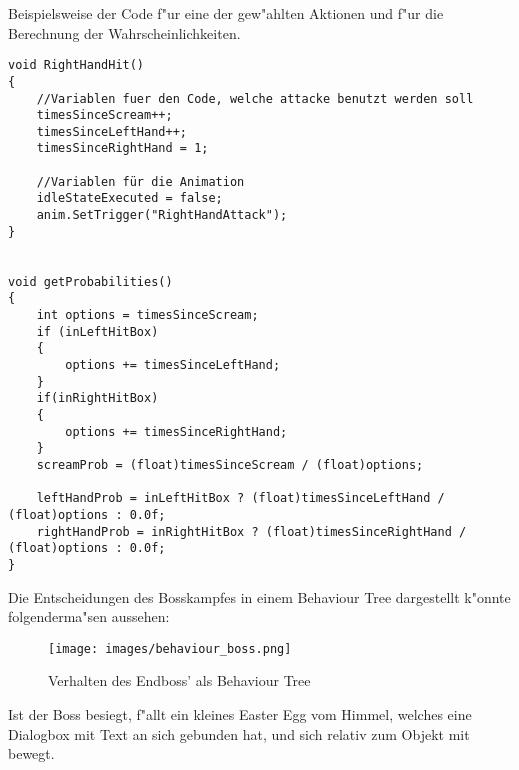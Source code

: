 Beispielsweise der Code f"ur eine der gew"ahlten Aktionen und f"ur die Berechnung der Wahrscheinlichkeiten.

\begin{lstlisting}[breaklines=true]
void RightHandHit()
{
	//Variablen fuer den Code, welche attacke benutzt werden soll
	timesSinceScream++;
	timesSinceLeftHand++;
	timesSinceRightHand = 1;
	
	//Variablen für die Animation
	idleStateExecuted = false;
	anim.SetTrigger("RightHandAttack");
}


void getProbabilities()
{
	int options = timesSinceScream;
	if (inLeftHitBox)
	{ 
		options += timesSinceLeftHand;
	}
	if(inRightHitBox)
	{
		options += timesSinceRightHand;
	}
	screamProb = (float)timesSinceScream / (float)options;
	
	leftHandProb = inLeftHitBox ? (float)timesSinceLeftHand / (float)options : 0.0f;
	rightHandProb = inRightHitBox ? (float)timesSinceRightHand / (float)options : 0.0f;
}
\end{lstlisting}

Die Entscheidungen des Bosskampfes in einem Behaviour Tree dargestellt k"onnte folgenderma"sen aussehen:
\begin{figure}
	\centering
	\texttt{[image: images/behaviour\_boss.png]}
	\caption{Verhalten des Endboss' als Behaviour Tree}
	\label{fig:behaviour_tree_boss}
\end{figure}


Ist der Boss besiegt, f"allt ein kleines Easter Egg vom Himmel, welches eine Dialogbox mit Text an sich gebunden hat, und sich relativ zum Objekt mit bewegt.